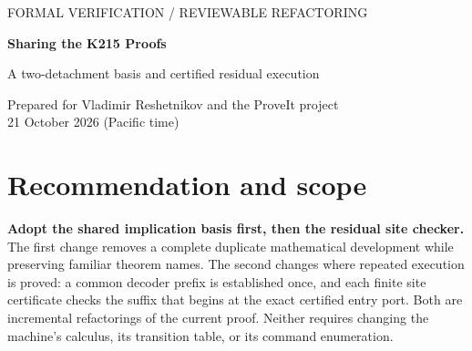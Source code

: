 \documentclass[11pt,letterpaper]{article}
\newcommand{\code}[1]{\texttt{\small\detokenize{#1}}}
\begin{document}
\begin{center}
{\small\sffamily\color{MidnightBlue} FORMAL VERIFICATION / REVIEWABLE REFACTORING}

{\LARGE\bfseries Sharing the K215 Proofs}

{\Large A two-detachment basis and certified residual execution}

\medskip
Prepared for Vladimir Reshetnikov and the ProveIt project\\
21 October 2026 (Pacific time)
\end{center}

\begin{abstract}
The 215-state machine already has substantial checked formalizations. The next
useful simplification is to share proofs at their mathematical interfaces, while
retaining the exact machine, source program, and public correctness statements.
This report develops two concrete changes against ProveIt commit
\code{57541fe0cfe3af62b4cb58747d8d1d7c16b338d5}. First, three lemmas already present
in the dominated-implication proof derive the implicational $S$ schema with only two
additional modus-ponens applications. Together with existing $K$ and Peirce
lemmas, this permits one abstract proof to serve the dominated numerical
calculus and the unrestricted calculus. The selected Lean logic sources shrink
from 42,454 to 18,096 bytes; the corresponding Rocq replacement also removes
duplicate basis proofs. Second, the already checked decoder-prefix theorem is
connected to a residual executor through a semantic site contract. The remaining
finite checks retain every literal leaf and both decrement outcomes. A third,
longer-term recommendation is to implement the previously proposed direct
full-seed construction, eliminating an intermediate semantic quotient in Lean.
We provide
source changes, reproducible checks, exact measurements, and integration gates.
Component verification is distinguished throughout from a new whole-endpoint
rebuild, and no new internal arithmetization or machine-state reduction is claimed.
\end{abstract}

\section{Recommendation and scope}

\textbf{Adopt the shared implication basis first, then the residual site checker.}
The first change removes a complete duplicate mathematical development while
preserving familiar theorem names. The second changes where repeated execution
is proved: a common decoder prefix is established once, and each finite site
certificate checks the suffix that begins at the exact certified entry port.
Both are incremental refactorings of the current proof. Neither requires changing
the machine's calculus, its transition table, or its command enumeration.
\end{document}
